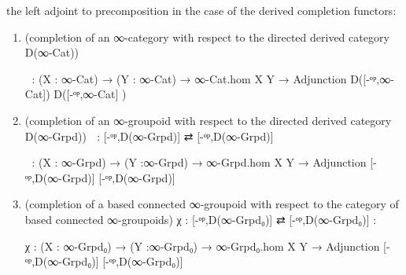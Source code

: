 \documentclass{book}
\theoremstyle{definition}
\begin{document}
{

 the left adjoint to precomposition in the case of the derived completion functors:

\begin{enumerate}
\item (completion of an ∞-category with respect to the directed derived category D(∞-Cat))
\begin{center}
 χ⃗  : (X : ∞-Cat) → (Y : ∞-Cat) → ∞-Cat.hom X Y → Adjunction D([-ᵒᵖ,∞-Cat]) D([-ᵒᵖ,∞-Cat] )
\end{center}
\item (completion of an ∞-groupoid with respect to the directed derived category D(∞-Grpd)) χ⃡ : [-ᵒᵖ,D(∞-Grpd)] ⇄ [-ᵒᵖ,D(∞-Grpd)]
\begin{center}
 χ⃡ : (X : ∞-Grpd) → (Y :∞-Grpd) → ∞-Grpd.hom X Y → Adjunction [-ᵒᵖ,D(∞-Grpd)] [-ᵒᵖ,D(∞-Grpd)]
\end{center}
\item (completion of a based connected ∞-groupoid with respect to the category of based connected ∞-groupoids) χ : [-ᵒᵖ,D(∞-Grpd₀)] ⇄ [-ᵒᵖ,D(∞-Grpd₀)] :
\begin{center}
 χ : (X : ∞-Grpd₀) → (Y :∞-Grpd₀) → ∞-Grpd₀.hom X Y → Adjunction [-ᵒᵖ,D(∞-Grpd₀)] [-ᵒᵖ,D(∞-Grpd₀)]
\end{center}
\end{enumerate}



}
\end{document}
